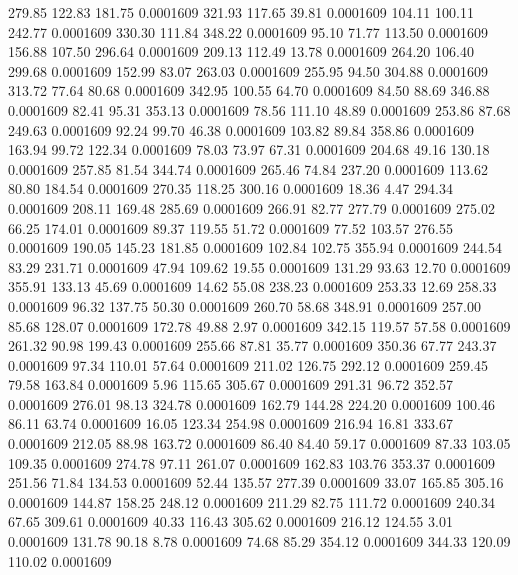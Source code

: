  279.85  122.83  181.75   0.0001609
 321.93  117.65   39.81   0.0001609
 104.11  100.11  242.77   0.0001609
 330.30  111.84  348.22   0.0001609
  95.10   71.77  113.50   0.0001609
 156.88  107.50  296.64   0.0001609
 209.13  112.49   13.78   0.0001609
 264.20  106.40  299.68   0.0001609
 152.99   83.07  263.03   0.0001609
 255.95   94.50  304.88   0.0001609
 313.72   77.64   80.68   0.0001609
 342.95  100.55   64.70   0.0001609
  84.50   88.69  346.88   0.0001609
  82.41   95.31  353.13   0.0001609
  78.56  111.10   48.89   0.0001609
 253.86   87.68  249.63   0.0001609
  92.24   99.70   46.38   0.0001609
 103.82   89.84  358.86   0.0001609
 163.94   99.72  122.34   0.0001609
  78.03   73.97   67.31   0.0001609
 204.68   49.16  130.18   0.0001609
 257.85   81.54  344.74   0.0001609
 265.46   74.84  237.20   0.0001609
 113.62   80.80  184.54   0.0001609
 270.35  118.25  300.16   0.0001609
  18.36    4.47  294.34   0.0001609
 208.11  169.48  285.69   0.0001609
 266.91   82.77  277.79   0.0001609
 275.02   66.25  174.01   0.0001609
  89.37  119.55   51.72   0.0001609
  77.52  103.57  276.55   0.0001609
 190.05  145.23  181.85   0.0001609
 102.84  102.75  355.94   0.0001609
 244.54   83.29  231.71   0.0001609
  47.94  109.62   19.55   0.0001609
 131.29   93.63   12.70   0.0001609
 355.91  133.13   45.69   0.0001609
  14.62   55.08  238.23   0.0001609
 253.33   12.69  258.33   0.0001609
  96.32  137.75   50.30   0.0001609
 260.70   58.68  348.91   0.0001609
 257.00   85.68  128.07   0.0001609
 172.78   49.88    2.97   0.0001609
 342.15  119.57   57.58   0.0001609
 261.32   90.98  199.43   0.0001609
 255.66   87.81   35.77   0.0001609
 350.36   67.77  243.37   0.0001609
  97.34  110.01   57.64   0.0001609
 211.02  126.75  292.12   0.0001609
 259.45   79.58  163.84   0.0001609
   5.96  115.65  305.67   0.0001609
 291.31   96.72  352.57   0.0001609
 276.01   98.13  324.78   0.0001609
 162.79  144.28  224.20   0.0001609
 100.46   86.11   63.74   0.0001609
  16.05  123.34  254.98   0.0001609
 216.94   16.81  333.67   0.0001609
 212.05   88.98  163.72   0.0001609
  86.40   84.40   59.17   0.0001609
  87.33  103.05  109.35   0.0001609
 274.78   97.11  261.07   0.0001609
 162.83  103.76  353.37   0.0001609
 251.56   71.84  134.53   0.0001609
  52.44  135.57  277.39   0.0001609
  33.07  165.85  305.16   0.0001609
 144.87  158.25  248.12   0.0001609
 211.29   82.75  111.72   0.0001609
 240.34   67.65  309.61   0.0001609
  40.33  116.43  305.62   0.0001609
 216.12  124.55    3.01   0.0001609
 131.78   90.18    8.78   0.0001609
  74.68   85.29  354.12   0.0001609
 344.33  120.09  110.02   0.0001609
